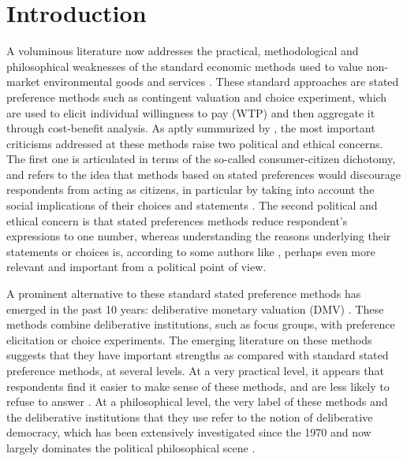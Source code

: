 \documentclass[smallextended,nospthms,natbib]{svjour3}
\begin{document}
\section{Introduction}
A voluminous literature now addresses the practical, methodological and philosophical weaknesses of the standard economic methods used to value non-market environmental goods and services \citep{meinard_ethical_2016}. These standard approaches are stated preference methods such as contingent valuation and choice experiment, which are used to elicit individual willingness to pay (WTP) and then aggregate it through cost-benefit analysis. As aptly summurized by \citet{bartkowski_beyond_2018}, the most important criticisms addressed at these methods raise two political and ethical concerns. The first one is articulated in terms of the so-called consumer-citizen dichotomy, and refers to the idea that methods based on stated preferences would discourage respondents from acting as citizens, in particular by taking into account the social implications of their choices and statements \citep{soma_representing_2014, vatn_institutional_2009}. The second political and ethical concern is that stated preferences methods reduce respondent's expressions to one number, whereas understanding the reasons underlying their statements or choices is, according to some authors like \citet{sen_environmental_1995}, perhaps even more relevant and important from a political point of view.

A prominent alternative to these standard stated preference methods has emerged in the past 10 years: deliberative monetary valuation (DMV) \citep{spash_deliberative_2007,bartkowski_economic_2017}. These methods combine deliberative institutions, such as focus groups, with preference elicitation or choice experiments. The emerging literature on these methods suggests that they have important strengths as compared with standard stated preference methods, at several levels. At a very practical level, it appears that respondents find it easier to make sense of these methods, and are less likely to refuse to answer \citep{lienhoop_contingent_2007,szabo_reducing_2011}. At a philosophical level, the very label of these methods and the deliberative institutions that they use refer to the notion of deliberative democracy, which has been extensively investigated since the 1970 and now largely dominates the political philosophical scene \citep{chappell_deliberative_2012}.
\end{document}
